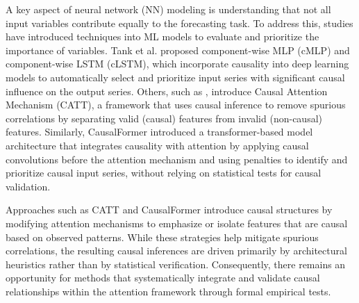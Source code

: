 \documentclass[acmsmall]{acmart}
\newcommand\sd[1]{\textbf{\textcolor{blue}{SD: #1}}	}
\begin{document}

A key aspect of neural network (NN) modeling is understanding that not all input variables contribute equally to the forecasting task. To address this, studies have introduced techniques into ML models to evaluate and prioritize the importance of variables. Tank et al. \cite{tank2021neural} proposed component-wise MLP (cMLP) and component-wise LSTM (cLSTM), which incorporate causality into deep learning models to automatically select and prioritize input series with significant causal influence on the output series. Others, such as \cite{wang2024rethinking}, introduce Causal Attention Mechanism (CATT), a framework that uses causal inference to remove spurious correlations by separating valid (causal) features from invalid (non-causal) features. Similarly, CausalFormer \cite{kong2024causalformer} introduced a transformer-based model architecture that integrates causality with attention by applying causal convolutions before the attention mechanism and using penalties to identify and prioritize causal input series, without relying on statistical tests for causal validation.




Approaches such as CATT and CausalFormer introduce causal structures by modifying attention mechanisms to emphasize or isolate features that are causal based on observed patterns. While these strategies help mitigate spurious correlations, the resulting causal inferences are driven primarily by architectural heuristics rather than by statistical verification. Consequently, there remains an opportunity for methods that systematically integrate and validate causal relationships within the attention framework through formal empirical tests.


\end{document}
